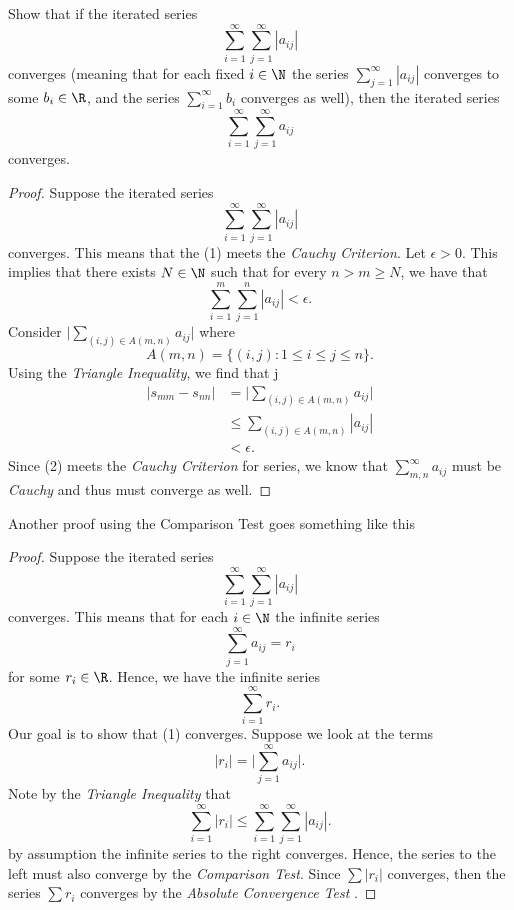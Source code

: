 Show that if the iterated series 
\[ \sum_{i=1}^{\infty} \sum_{j=1}^{\infty} |a_{ij}|\]
converges (meaning that for each fixed \( i \in \N \) the series \( \sum_{j=1}^{\infty} |a_{ij}|\) converges to some \( b_i \in \R \), and the series \( \sum_{i=1}^{\infty} b_i \) converges as well), then the iterated series 
\[ \sum_{i=1}^{\infty} \sum_{j=1}^{\infty} a_{ij}\]
converges.

\begin{proof}
Suppose the iterated series 
\[ \sum_{i=1}^{\infty} \sum_{j=1}^{\infty} |a_{ij}|  \tag{1}\]
converges. This means that the (1) meets the \textit{Cauchy Criterion}. Let \(\epsilon > 0 \). This implies that there exists \( N \in \N \) such that for every \( n > m  \geq N \), we have that 
\[ \sum_{i= 1}^{m} \sum_{j= 1}^{n} |a_{ij}| < \epsilon.\]
Consider \( \Big| \sum_{(i,j) \in A(m,n)} a_{ij} \Big|\) where 
\[  A(m,n) = \{ (i,j) : 1 \leq i \leq j \leq n \}.  \] Using the \textit{Triangle Inequality}, we find that  
j\begin{align*}
    \Big| s_{m m} - s_{nn} \Big| &= \Big| \sum_{ (i,j) \in A(m,n)} a_{ij} \Big| \\ 
                                 &\leq \sum_{(i,j) \in A(m,n)} | a_{ij} | \tag{2}\\                          &< \epsilon.
\end{align*}
Since (2) meets the \textit{Cauchy Criterion} for series, we know that \( \sum_{ m,n }^{ \infty  } a_{ij} \) must be \textit{Cauchy} and thus must converge as well. 
\end{proof}

Another proof using the Comparison Test goes something like this

\begin{proof}
    Suppose the iterated series 
    \[ \sum_{i=1}^{\infty} \sum_{j=1}^{\infty} |a_{ij}| \]
    converges. This means that for each \( i \in \N \) the infinite series 
    \[ \sum_{j=1}^{\infty} a_{ij} = r_i \] for some \( r_i \in \R \). Hence, we have the infinite series 
    \[ \sum_{i=1}^{\infty} r_i. \tag{1} \]
    Our goal is to show that (1) converges. Suppose we look at the terms 
    \[ |r_i| = \Big| \sum_{j=1}^{\infty} a_{ij}\Big|.\]
    Note by the \textit{Triangle Inequality} that 
    \[ \sum_{i=1}^{\infty} |r_i| \leq \sum_{i=1}^{\infty} \sum_{j=1}^{\infty} |a_{ij}|.  \]
    by assumption the infinite series to the right converges. Hence, the series to the left must also converge by the \textit{Comparison Test}. Since \( \sum |r_i|\) converges, then the series 
    \( \sum r_i \) converges by the \textit{ Absolute Convergence Test }. 
\end{proof}

